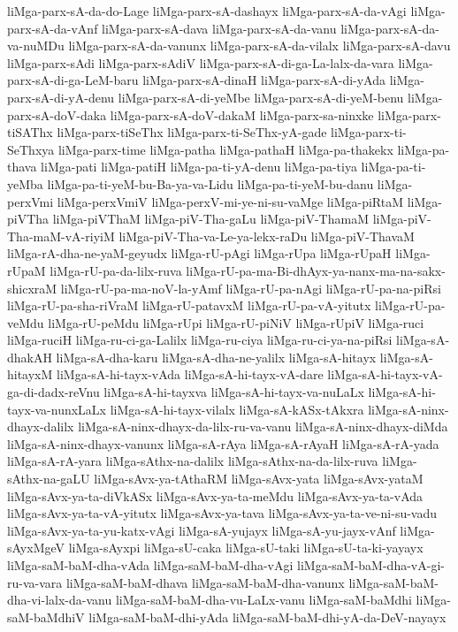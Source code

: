 {liMga-parx-sA-da-do-Lage
liMga-parx-sA-dashayx
liMga-parx-sA-da-vAgi
liMga-parx-sA-da-vAnf
liMga-parx-sA-dava
liMga-parx-sA-da-vanu
liMga-parx-sA-da-va-nuMDu
liMga-parx-sA-da-vanunx
liMga-parx-sA-da-vilalx
liMga-parx-sA-davu
liMga-parx-sAdi
liMga-parx-sAdiV
liMga-parx-sA-di-ga-La-lalx-da-vara
liMga-parx-sA-di-ga-LeM-baru
liMga-parx-sA-dinaH
liMga-parx-sA-di-yAda
liMga-parx-sA-di-yA-denu
liMga-parx-sA-di-yeMbe
liMga-parx-sA-di-yeM-benu
liMga-parx-sA-doV-daka
liMga-parx-sA-doV-dakaM
liMga-parx-sa-ninxke
liMga-parx-tiSAThx
liMga-parx-tiSeThx
liMga-parx-ti-SeThx-yA-gade
liMga-parx-ti-SeThxya
liMga-parx-time
liMga-patha
liMga-pathaH
liMga-pa-thakekx
liMga-pa-thava
liMga-pati
liMga-patiH
liMga-pa-ti-yA-denu
liMga-pa-tiya
liMga-pa-ti-yeMba
liMga-pa-ti-yeM-bu-Ba-ya-va-Lidu
liMga-pa-ti-yeM-bu-danu
liMga-perxVmi
liMga-perxVmiV
liMga-perxV-mi-ye-ni-su-vaMge
liMga-piRtaM
liMga-piVTha
liMga-piVThaM
liMga-piV-Tha-gaLu
liMga-piV-ThamaM
liMga-piV-Tha-maM-vA-riyiM
liMga-piV-Tha-va-Le-ya-lekx-raDu
liMga-piV-ThavaM
liMga-rA-dha-ne-yaM-geyudx
liMga-rU-pAgi
liMga-rUpa
liMga-rUpaH
liMga-rUpaM
liMga-rU-pa-da-lilx-ruva
liMga-rU-pa-ma-Bi-dhAyx-ya-nanx-ma-na-sakx-shicxraM
liMga-rU-pa-ma-noV-la-yAmf
liMga-rU-pa-nAgi
liMga-rU-pa-na-piRsi
liMga-rU-pa-sha-riVraM
liMga-rU-patavxM
liMga-rU-pa-vA-yitutx
liMga-rU-pa-veMdu
liMga-rU-peMdu
liMga-rUpi
liMga-rU-piNiV
liMga-rUpiV
liMga-ruci
liMga-ruciH
liMga-ru-ci-ga-Lalilx
liMga-ru-ciya
liMga-ru-ci-ya-na-piRsi
liMga-sA-dhakAH
liMga-sA-dha-karu
liMga-sA-dha-ne-yalilx
liMga-sA-hitayx
liMga-sA-hitayxM
liMga-sA-hi-tayx-vAda
liMga-sA-hi-tayx-vA-dare
liMga-sA-hi-tayx-vA-ga-di-dadx-reVnu
liMga-sA-hi-tayxva
liMga-sA-hi-tayx-va-nuLaLx
liMga-sA-hi-tayx-va-nunxLaLx
liMga-sA-hi-tayx-vilalx
liMga-sA-kASx-tAkxra
liMga-sA-ninx-dhayx-dalilx
liMga-sA-ninx-dhayx-da-lilx-ru-va-vanu
liMga-sA-ninx-dhayx-diMda
liMga-sA-ninx-dhayx-vanunx
liMga-sA-rAya
liMga-sA-rAyaH
liMga-sA-rA-yada
liMga-sA-rA-yara
liMga-sAthx-na-dalilx
liMga-sAthx-na-da-lilx-ruva
liMga-sAthx-na-gaLU
liMga-sAvx-ya-tAthaRM
liMga-sAvx-yata
liMga-sAvx-yataM
liMga-sAvx-ya-ta-diVkASx
liMga-sAvx-ya-ta-meMdu
liMga-sAvx-ya-ta-vAda
liMga-sAvx-ya-ta-vA-yitutx
liMga-sAvx-ya-tava
liMga-sAvx-ya-ta-ve-ni-su-vadu
liMga-sAvx-ya-ta-yu-katx-vAgi
liMga-sA-yujayx
liMga-sA-yu-jayx-vAnf
liMga-sAyxMgeV
liMga-sAyxpi
liMga-sU-caka
liMga-sU-taki
liMga-sU-ta-ki-yayayx
liMga-saM-baM-dha-vAda
liMga-saM-baM-dha-vAgi
liMga-saM-baM-dha-vA-gi-ru-va-vara
liMga-saM-baM-dhava
liMga-saM-baM-dha-vanunx
liMga-saM-baM-dha-vi-lalx-da-vanu
liMga-saM-baM-dha-vu-LaLx-vanu
liMga-saM-baMdhi
liMga-saM-baMdhiV
liMga-saM-baM-dhi-yAda
liMga-saM-baM-dhi-yA-da-DeV-nayayx
}
